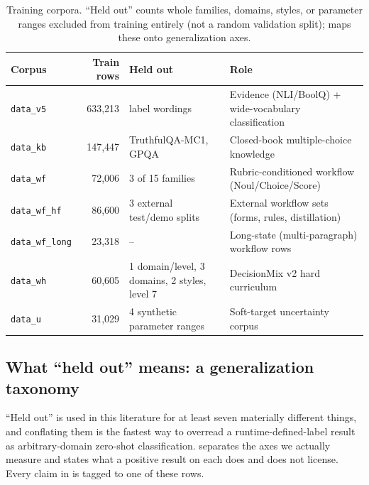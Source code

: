 \begin{table}[t]
  \centering
  \caption{Training corpora. ``Held out'' counts whole families, domains, styles, or parameter ranges
  excluded from training entirely (not a random validation split);  maps these
  onto generalization axes.}
  \label{tab:corpora}
  \small
  \setlength{\tabcolsep}{4pt}
  \begin{tabular}{lrp{3.2cm}p{5.0cm}}
    \toprule
    Corpus & Train rows & Held out & Role \\
    \midrule
    \texttt{data\_v5} & 633{,}213 & label wordings & Evidence (NLI/BoolQ) + wide-vocabulary classification \\
    \texttt{data\_kb} & 147{,}447 & TruthfulQA-MC1, GPQA & Closed-book multiple-choice knowledge \\
    \texttt{data\_wf} & 72{,}006 & 3 of 15 families & Rubric-conditioned workflow (Noul/Choice/Score) \\
    \texttt{data\_wf\_hf} & 86{,}600 & 3 external test/demo splits & External workflow sets (forms, rules, distillation) \\
    \texttt{data\_wf\_long} & 23{,}318 & -- & Long-state (multi-paragraph) workflow rows \\
    \texttt{data\_wh} & 60{,}605 & 1 domain/level, 3 domains, 2 styles, level 7 & DecisionMix v2 hard curriculum \\
    \texttt{data\_u} & 31{,}029 & 4 synthetic parameter ranges & Soft-target uncertainty corpus \\
    \bottomrule
  \end{tabular}
\end{table}

\subsection{What ``held out'' means: a generalization taxonomy}
\label{sec:experiments:heldout}

``Held out'' is used in this literature for at least seven materially different things, and conflating
them is the fastest way to overread a runtime-defined-label result as arbitrary-domain zero-shot
classification.  separates the axes we actually measure and states what a
positive result on each does and does not license. Every claim in 
is tagged to one of these rows.

